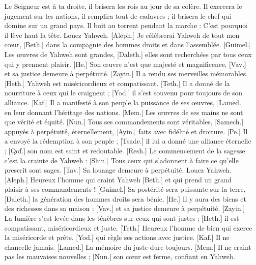 \begin{multicols}{2}
Le Seigneur est à ta droite, il brisera les rois au jour de sa colère.
Il exercera le jugement sur les nations, il remplira tout de cadavres ; il brisera le chef qui domine sur un grand pays.
Il boit au torrent pendant la marche : C'est pourquoi il lève haut la tête.
\VerseOne{}Louez Yahweh. [Aleph.] Je célébrerai Yahweh de tout mon cœur, [Beth.] dans la compagnie des hommes droits et dans l'assemblée.
[Guimel.] Les œuvres de Yahweh sont grandes, [Daleth.] elles sont recherchées par tous ceux qui y prennent plaisir.
[He.] Son œuvre n'est que majesté et magnificence, [Vav.] et sa justice demeure à perpétuité.
[Zayin.] Il a rendu ses merveilles mémorables. [Heth.] Yahweh est miséricordieux et compatissant.
[Teth.] Il a donné de la nourriture à ceux qui le craignent ; [Yod.] il s'est souvenu pour toujours de son alliance.
[Kaf.] Il a manifesté à son peuple la puissance de ses œuvres, [Lamed.] en leur donnant l'héritage des nations.
[Mem.] Les œuvres de ses mains ne sont que vérité et équité. [Nun.] Tous ses commandements sont véritables,
[Samech.] appuyés à perpétuité, éternellement, [Ayin.] faits avec fidélité et droiture.
[Pe.] Il a envoyé la rédemption à son peuple ; [Tsade.] il lui a donné une alliance éternelle ; [Qof.] son nom est saint et redoutable.
[Resh.] Le commencement de la sagesse c'est la crainte de Yahweh : [Shin.] Tous ceux qui s'adonnent à faire ce qu'elle prescrit sont sages. [Tav.] Sa louange demeure à perpétuité.
\VerseOne{}Louez Yahweh. [Aleph.] Heureux l'homme qui craint Yahweh [Beth.] et qui prend un grand plaisir à ses commandements !
[Guimel.] Sa postérité sera puissante sur la terre, [Daleth.] la génération des hommes droits sera bénie.
[He.] Il y aura des biens et des richesses dans sa maison ; [Vav.] et sa justice demeure à perpétuité.
[Zayin.] La lumière s'est levée dans les ténèbres sur ceux qui sont justes ; [Heth.] il est compatissant, miséricordieux et juste.
[Teth.] Heureux l'homme de bien qui exerce la miséricorde et prête, [Yod.] qui règle ses actions avec justice.
[Kaf.] Il ne chancelle jamais. [Lamed.] La mémoire du juste dure toujours.
[Mem.] Il ne craint pas les mauvaises nouvelles ; [Nun.] son cœur est ferme, confiant en Yahweh.

\end{multicols}
